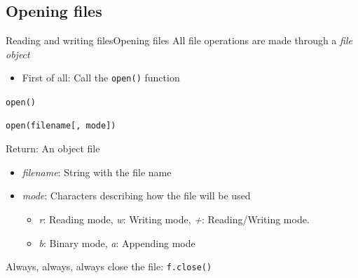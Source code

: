 \documentclass[10pt,compress]{beamer} %
\begin{document}
\subsection{Opening files}
\begin{frame}[fragile]{Reading and writing files}{Opening files}
	All file operations are made through a \textit{file object}
		\begin{itemize}
		\item \small{First of all: Call the \texttt{open()} function}
		\end{itemize}

	\begin{block}{\texttt{open()}}
	\vspace{-0.2cm}
\begin{verbatim}
open(filename[, mode])
\end{verbatim}
	\vspace{-0.2cm}
	Return: An object file\\
	\vspace{-0.2cm}
	\begin{itemize}
	\item \textit{filename}: String with the file name
	\item \textit{mode}: Characters describing how the file will be used
		\begin{itemize}
		\item \textit{r}: Reading mode, \textit{w}: Writing mode,  \textit{+}:  Reading/Writing mode. %
		\item \textit{b}: Binary mode, \textit{a}: Appending mode
		\end{itemize}
	\end{itemize}
	\end{block}

	\smallskip

	\begin{alertblock}{}
	Always, always, always close the file: \texttt{f.close()}
	\end{alertblock}
\end{frame}
\end{document}
